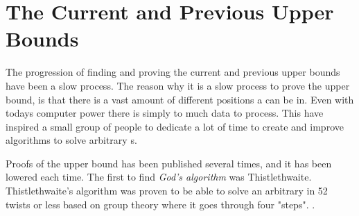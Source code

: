 \section{The Current and Previous Upper Bounds}
The progression of finding and proving the current and previous upper bounds have been a slow process.
The reason why it is a slow process to prove the upper bound, is that there is a vast amount of different positions a \rubik{} can be in. Even with todays computer power there is simply to much data to process. This have inspired a small group of people to dedicate a lot of time to create and improve algorithms to solve arbitrary \rubik{}s.

\begin{comment}

The set solver created by Thomas Rockicki, which was described in the previous section will now be further described.


The set solver has a special way of testing the \rubik{}s. It does not solve them to the unit position $e$, instead it finds a move sequence for a subgroup of the \rubik{} this way it can solve approximately 19.5 billion cubes at a time and not just one. The reason for this is that if you relabel an arbitrary cube, that given cube can be unlabeled to approximately 19.5 billion different cube positions. Recall that there are approximately 19.5 billion positions in the set \m{H} and all these positions are equal to $e$ when relabeled. The same logic applies to any other given position.
\end{comment}

Proofs of the upper bound has been published several times, and it has been lowered each time.
The first to find \textit{God's algorithm} was Thistlethwaite. Thistlethwaite's algorithm was proven to be able to solve an arbitrary \rubik{} in 52 twists or less based on group theory where it goes through four "steps". \cite{jaapthistle}.

